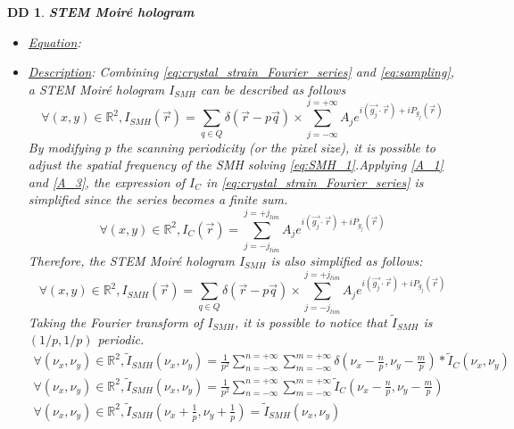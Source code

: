 \documentclass[12pt]{article}
\newtheorem{DD}{DD}
\begin{document}
\begin{DD}
\label{DD_2}
\noindent\colorbox{shadecolorDD}{\normalfont \textbf{STEM Moir{\'e} hologram}}
\normalfont
\begin{itemize}
\item \underline{Equation}: 
\item \underline{Description}: Combining \cref{eq:crystal_strain_Fourier_series} and \cref{eq:sampling}, a STEM Moir{\'e} hologram $I_{SMH}$ can be described as follows
\begin{equation}
\forall (x,y) \in \mathbb{R}^{2}, I_{SMH}(\vec{r})=\sum_{q\in Q}\delta(\vec{r}-p\vec{q})\times\sum_{j=-\infty}^{j=+\infty}A_je^{i(\vec{g_j}\cdot\vec{r})+iP_{g_{j}}(\vec{r})}
\label{eq:SMH_1}
\end{equation}
By modifying $p$ the scanning periodicity (or the pixel size), it is possible to adjust the spatial frequency of the SMH solving \cref{eq:SMH_1}.Applying \cref{A_1} and \cref{A_3}, the expression of $I_C$ in \cref{eq:crystal_strain_Fourier_series} is simplified since the series becomes a finite sum.
\begin{equation}
\forall (x,y) \in \mathbb{R}^{2},I_C(\vec{r})=\sum_{j=-j_{lim}}^{j=+j_{lim}}A_je^{i(\vec{g_j}\cdot\vec{r})+iP_{g_{j}}(\vec{r})}
\label{eq:crystal_lattice_simplified}
\end{equation}
Therefore, the STEM Moir{\'e} hologram $I_{SMH}$ is also simplified as follows:
\begin{equation}
\forall (x,y) \in \mathbb{R}^{2}, I_{SMH}(\vec{r})=\sum_{q\in Q}\delta(\vec{r}-p\vec{q})\times\sum_{j=-j_{lim}}^{j=+j_{lim}}A_je^{i(\vec{g_j}\cdot\vec{r})+iP_{g_{j}}(\vec{r})}
\label{eq:SMH_simplified_1}
\end{equation}
Taking the Fourier transform of $I_{SMH}$, it is possible to notice that $\widetilde{I}_{SMH}$ is $(1/p,1/p)$ periodic.  
\begin{equation}
\begin{gathered}
\forall (\nu_x,\nu_y) \in \mathbb{R}^{2}, \widetilde{I}_{SMH}(\nu_x,\nu_y)=\frac{1}{p^2}\sum_{n=-\infty}^{n=+\infty}\sum_{m=-\infty}^{m=+\infty}\delta(\nu_x-\frac{n}{p},\nu_y-\frac{m}{p})\ast\widetilde{I}_{C}(\nu_x,\nu_y) \\
\forall (\nu_x,\nu_y) \in \mathbb{R}^{2}, \widetilde{I}_{SMH}(\nu_x,\nu_y)=\frac{1}{p^2}\sum_{n=-\infty}^{n=+\infty}\sum_{m=-\infty}^{m=+\infty}\widetilde{I}_{C}(\nu_x-\frac{n}{p},\nu_y-\frac{m}{p}) \\
\forall (\nu_x,\nu_y) \in \mathbb{R}^{2}, \widetilde{I}_{SMH}(\nu_x+\frac{1}{p},\nu_y+\frac{1}{p})=\widetilde{I}_{SMH}(\nu_x,\nu_y)

\end{gathered}
\end{equation}
\end{itemize}
\end{DD}
\end{document}
